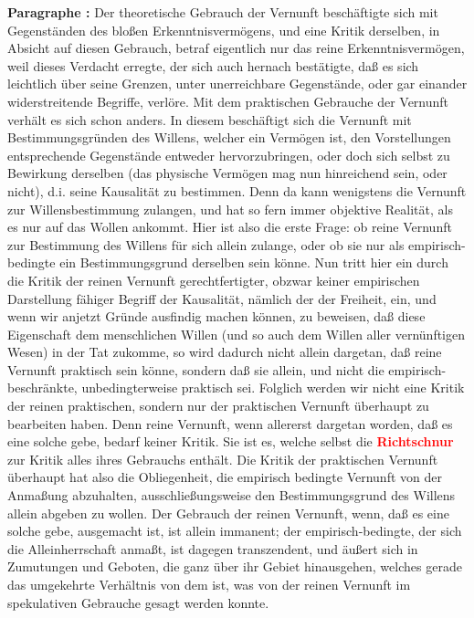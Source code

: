 \documentclass[a4paper,12pt,twoside]{book}
\newcommand{\match}[1]{\textcolor{red}{\textbf{#1}}}
\begin{document}
	\noindent\textbf{Paragraphe : }Der theoretische Gebrauch der Vernunft beschäftigte sich mit Gegenständen des bloßen Erkenntnisvermögens, und eine Kritik derselben, in Absicht auf diesen Gebrauch, betraf eigentlich nur das reine Erkenntnisvermögen, weil dieses Verdacht erregte, der sich auch hernach bestätigte, daß es sich leichtlich über seine Grenzen, unter unerreichbare Gegenstände, oder gar einander widerstreitende Begriffe, verlöre. Mit dem praktischen Gebrauche der Vernunft verhält es sich schon anders. In diesem beschäftigt sich die Vernunft mit Bestimmungsgründen des Willens, welcher ein Vermögen ist, den Vorstellungen entsprechende Gegenstände entweder hervorzubringen, oder doch sich selbst zu Bewirkung derselben (das physische Vermögen mag nun hinreichend sein, oder nicht), d.i. seine Kausalität zu bestimmen. Denn da kann wenigstens die Vernunft zur Willensbestimmung zulangen, und hat so fern immer objektive Realität, als es nur auf das Wollen ankommt. Hier ist also die erste Frage: ob reine Vernunft zur Bestimmung des Willens für sich allein zulange, oder ob sie nur als empirisch- bedingte ein Bestimmungsgrund derselben sein könne. Nun tritt hier ein durch die Kritik der reinen Vernunft gerechtfertigter, obzwar keiner empirischen Darstellung fähiger Begriff der Kausalität, nämlich der der Freiheit, ein, und wenn wir anjetzt Gründe ausfindig machen können, zu beweisen, daß diese Eigenschaft dem menschlichen Willen (und so auch dem Willen aller vernünftigen Wesen) in der Tat zukomme, so wird dadurch nicht allein dargetan, daß reine Vernunft praktisch sein könne, sondern daß sie allein, und nicht die empirisch-beschränkte, unbedingterweise praktisch sei. Folglich werden wir nicht eine Kritik der reinen praktischen, sondern nur der praktischen Vernunft überhaupt zu bearbeiten haben. Denn reine Vernunft, wenn allererst dargetan worden, daß es eine solche gebe, bedarf keiner Kritik. Sie ist es, welche selbst die \match{Richtschnur} zur Kritik alles ihres Gebrauchs enthält. Die Kritik der praktischen Vernunft überhaupt  hat also die Obliegenheit, die empirisch bedingte Vernunft von der Anmaßung abzuhalten, ausschließungsweise den Bestimmungsgrund des Willens allein abgeben zu wollen. Der Gebrauch der reinen Vernunft, wenn, daß es eine solche gebe, ausgemacht ist, ist allein immanent; der empirisch-bedingte, der sich die Alleinherrschaft anmaßt, ist dagegen transzendent, und äußert sich in Zumutungen und Geboten, die ganz über ihr Gebiet hinausgehen, welches gerade das umgekehrte Verhältnis von dem ist, was von der reinen Vernunft im spekulativen Gebrauche gesagt werden konnte. 
	
\end{document}

